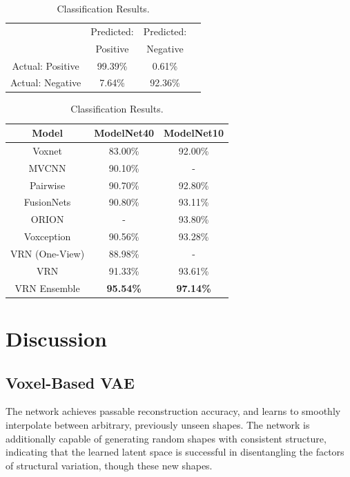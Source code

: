 \documentclass{article}
\begin{document}
\begin{table}[ht]
  \centering
  \setlength\tabcolsep{4pt}
  \begin{minipage}{.5\textwidth}
  \centering

  
  \caption{Reconstruction Results.}
  \label{reconstruction-table}
  \begin{tabular}{cccc}
  	
    \toprule
	
        & Predicted: & Predicted: \\ 
        & Positive     & Negative \\
    \midrule
    Actual: Positive & 99.39\%  & 0.61\%     \\
    Actual: Negative & 7.64\% & 92.36\%    \\
    \bottomrule
  \end{tabular}
  
\end{minipage}\begin{minipage}{.5\textwidth}
  \centering

  
  \caption{Classification Results.}
  \label{Class-table}
  \begin{tabular}{ccc}
    \toprule
    Model & ModelNet40 &  ModelNet10    \\
    \midrule
    
  	Voxnet & 83.00\% & 92.00\%\\
  	MVCNN & 90.10\% & - \\
  	Pairwise & 90.70\% & 92.80\%\\
  	FusionNets & 90.80\% & 93.11\%\\
  	ORION & - & 93.80\% \\
  	Voxception & 90.56\% & 93.28\%\\
  	VRN (One-View) & 88.98\% & - \\
  	VRN & 91.33\% & 93.61\%\\
  	VRN Ensemble & {\bf 95.54\%} & {\bf 97.14\%}\\
  
    \bottomrule

  \end{tabular}
\end{minipage}
\end{table}
\section{Discussion}

\subsection{Voxel-Based VAE}
The network achieves passable reconstruction accuracy, and learns to smoothly interpolate between arbitrary, previously unseen shapes. The network is additionally capable of generating random shapes with consistent structure, indicating that the learned latent space is successful in disentangling the factors of structural variation, though these new shapes.
\end{document}
